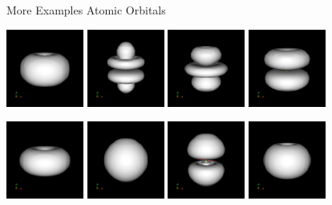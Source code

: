 \documentclass{beamer}
\begin{document}
\begin{frame}{More Examples Atomic Orbitals}

\includegraphics[width=1in]{../img/orbital_n3l2m2.png}
\includegraphics[width=1in]{../img/orbital_n4l3m0.png}
\includegraphics[width=1in]{../img/orbital_n4l3m1.png}
\includegraphics[width=1in]{../img/orbital_n4l3m2.png}

\includegraphics[width=1in]{../img/orbital_n4l3m3.png}
\includegraphics[width=1in]{../img/orbital_n5l0m0.png}
\includegraphics[width=1in]{../img/orbital_n5l1m0.png}
\includegraphics[width=1in]{../img/orbital_n5l1m1.png}


\end{frame}
\end{document}
